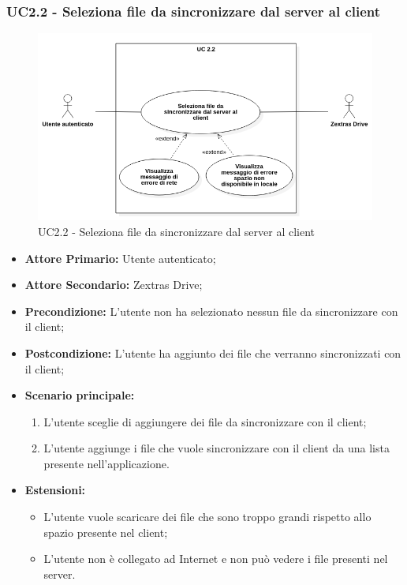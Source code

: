 \subsubsection{UC2.2 - Seleziona file da sincronizzare dal server al client}
\begin{figure}[H]
    \centering
    \includegraphics[scale = 0.7]{components/img/UC2_2.png}
    \caption{UC2.2 - Seleziona file da sincronizzare dal server al client}
\end{figure}
\begin{itemize}
\item \textbf{Attore Primario:} Utente autenticato;
\item \textbf{Attore Secondario:} Zextras Drive;
\item \textbf{Precondizione:} L'utente non ha selezionato nessun file da sincronizzare con il client;
\item \textbf{Postcondizione:} L'utente ha aggiunto dei file che verranno sincronizzati con il client;
\item \textbf{Scenario principale:}
    \begin{enumerate}
    \item L'utente sceglie di aggiungere dei file da sincronizzare con il client;
    \item L'utente aggiunge i file che vuole sincronizzare con il client da una lista presente nell'applicazione.
    \end{enumerate}
\item \textbf{Estensioni:}
    \begin{itemize}
    \item L'utente vuole scaricare dei file che sono troppo grandi rispetto allo spazio presente nel client;
    \item L'utente non è collegato ad Internet e non può vedere i file presenti nel server.
    \end{itemize}
\end{itemize}

